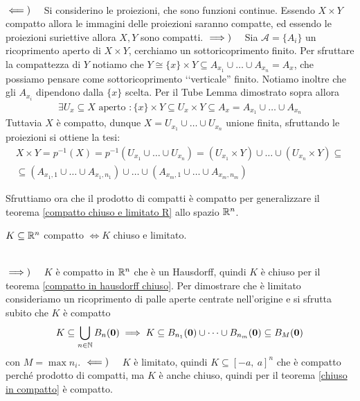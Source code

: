 \begin{demonstration}~{}\\
	$\impliedby)\quad $ Si considerino le proiezioni, che sono funzioni continue. Essendo $X\times Y$ compatto allora le immagini delle proiezioni saranno compatte, ed essendo le proiezioni suriettive allora $X,Y$ sono compatti. \newline
	$\implies)\quad $ Sia $\mathcal{A}=\{A_i\}$ un ricoprimento aperto di $X\times Y$, cerchiamo un sottoricoprimento finito.\newline
	Per sfruttare la compattezza di $Y$ notiamo che $Y\cong \{x\}\times Y\subseteq A_{x_1}\cup\dots\cup A_{x_n}=A_x$, che possiamo pensare come sottoricoprimento ‘‘verticale'' finito. Notiamo inoltre che gli $A_{x_i}$ dipendono dalla $\{x\}$ scelta.\newline
	Per il Tube Lemma dimostrato sopra allora
		\begin{gather*}
			\exists U_x\subseteq X \text{ aperto }\colon \{ x\}\times Y \subseteq U_x\times Y \subseteq A_x=A_{x_1}\cup\dots\cup A_{x_n}
		\end{gather*}
	Tuttavia $X$ è compatto, dunque $X=U_{x_1}\cup\dots\cup U_{x_n}$ unione finita, sfruttando le proiezioni si ottiene la tesi:
		\begin{gather*}
			X\times Y =p^{-1}(X)=p^{-1}\left( U_{x_1}\cup\dots\cup U_{x_n}\right)= (U_{x_1}\times Y)\cup\dots\cup (U_{x_n}\times Y)\subseteq \\
			\subseteq \left( A_{x_1 , 1}\cup\dots\cup A_{x_1, n_1}\right) \cup\dots\cup \left( A_{x_m, 1}\cup\dots\cup A_{x_m, n_m} \right)
		\end{gather*}
\end{demonstration}
Sfruttiamo ora che il prodotto di compatti è compatto per generalizzare il teorema \ref{compatto chiuso e limitato R} allo spazio $\mathbb{R} ^n$.
\begin{theorema} \label{compatto chiuso e limitato R^n}
	$K\subseteq \mathbb{R}^n$ compatto $\iff K$ chiuso e limitato.
\end{theorema}
\begin{demonstration} ~{} \\
	$\implies)\quad$ $K$ è compatto in $\mathbb{R}^n$ che è un Hausdorff, quindi $K$ è chiuso per il teorema \ref{compatto in hausdorff chiuso}. Per dimostrare che è limitato  consideriamo un ricoprimento di palle aperte centrate nell'origine e si sfrutta subito che $K$ è compatto
		\begin{gather*}
			K\subseteq \mathop{{\bigcup}}\displaylimits_{n\in\mathbb{N}} B_n(\mathbf{0}) \implies K\subseteq B_{n_1}(\mathbf{0})\cup\dots\cup B_{n_m}(\mathbf{0}) \subseteq B_M (\mathbf{0})
		\end{gather*}
	con $M=\max n_i$.\newline
	$\impliedby)\quad$ $K$ è limitato, quindi $K\subseteq [-a,\ a]^n$ che è compatto perché prodotto di compatti, ma $K$ è anche chiuso, quindi per il teorema \ref{chiuso in compatto} è compatto.
\end{demonstration}
